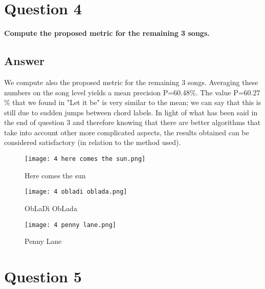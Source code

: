 \documentclass{article}
\begin{document}

\section*{\color{red}Question 4}

\begin{problem}
	\textbf{Compute the proposed metric for the remaining 3 songs.}
\end{problem}

\subsection*{\color{blue}Answer}

We compute also the proposed metric for the remaining 3 songs.
Averaging these numbers on the song level yields a mean precision P=60.48\begin{math}\% \end{math}. The value P=60.27\begin{math}\% \end{math} that we found in "Let it be" is very similar to the mean; we can say that this is still due to sudden jumps between chord labels. In light of what has been said in the end of question 3 and therefore knowing that there are better algorithms that take into account other more complicated aspects, the results obtained can be considered satisfactory (in relation to the method used).

\begin{figure}[H]
 \centering
 \texttt{[image: 4 here comes the sun.png]}
 \caption{Here comes the sun}
\end{figure}

\begin{figure}[H]
 \centering
 \texttt{[image: 4 obladi oblada.png]}
 \caption{ObLaDì ObLada}
\end{figure}

\begin{figure}[H]
 \centering
 \texttt{[image: 4 penny lane.png]}
 \caption{Penny Lane}
\end{figure}


\section*{\color{red}Question 5}
\end{document}
